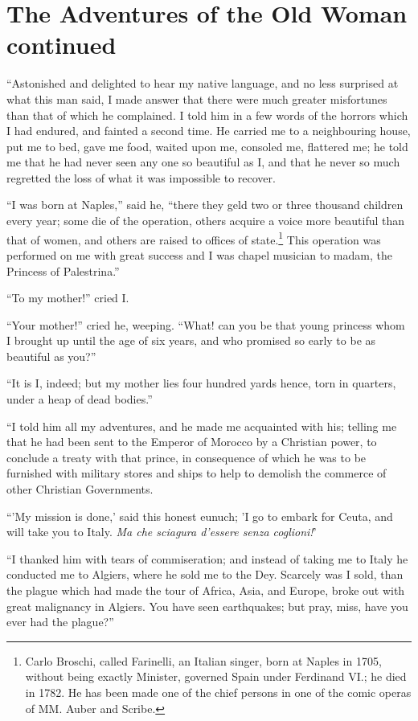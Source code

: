 \vspace{1cm}
\chapter{The Adventures of the Old Woman continued}
\thispagestyle{pter}
\vspace{-1cm}
``Astonished and delighted to hear my native language, and no less surprised at what this man said, I made answer that there were much greater misfortunes than that of which he complained. I told him in a few words of the horrors which I had endured, and fainted a second time. He carried me to a neighbouring house, put me to bed, gave me food, waited upon me, consoled me, flattered me; he told me that he had never seen any one so beautiful as I, and that he never so much regretted the loss of what it was impossible to recover.

``I was born at Naples,'' said he, ``there they geld two or three thousand children every year; some die of the operation, others acquire a voice more beautiful than that of women, and others are raised to offices of state.\footnote{Carlo Broschi, called Farinelli, an Italian singer, born at Naples in 1705, without being exactly Minister, governed Spain under Ferdinand VI.; he died in 1782. He has been made one of the chief persons in one of the comic operas of MM. Auber and Scribe.} This operation was performed on me with great success and I was chapel musician to madam, the Princess of Palestrina.''

``To my mother!'' cried I.

``Your mother!'' cried he, weeping. ``What! can you be that young princess whom I brought up until the age of six years, and who promised so early to be as beautiful as you?''

``It is I, indeed; but my mother lies four hundred yards hence, torn in quarters, under a heap of dead bodies.''

``I told him all my adventures, and he made me acquainted with his; telling me that he had been sent to the Emperor of Morocco by a Christian power, to conclude a treaty with that prince, in consequence of which he was to be furnished with military stores and ships to help to demolish the commerce of other Christian Governments.

``'My mission is done,' said this honest eunuch; 'I go to embark for Ceuta, and will take you to Italy. \textit{Ma che sciagura d'essere senza coglioni!}'

``I thanked him with tears of commiseration; and instead of taking me to Italy he conducted me to Algiers, where he sold me to the Dey. Scarcely was I sold, than the plague which had made the tour of Africa, Asia, and Europe, broke out with great malignancy in Algiers. You have seen earthquakes; but pray, miss, have you ever had the plague?''

